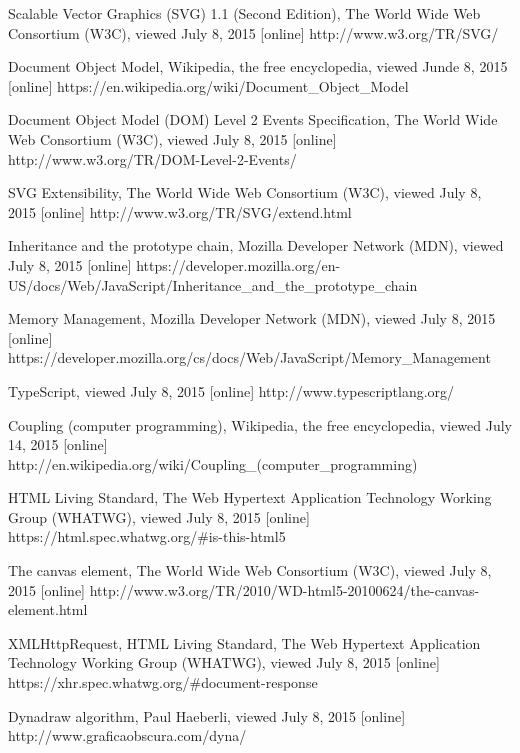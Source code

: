 \begin{thebibliography}{99}
Scalable Vector Graphics (SVG) 1.1 (Second Edition), The World Wide Web Consortium (W3C), viewed July 8, 2015 [online]
http://www.w3.org/TR/SVG/

Document Object Model, Wikipedia, the free encyclopedia, viewed Junde 8, 2015 [online]
https://en.wikipedia.org/wiki/Document\_Object\_Model

Document Object Model (DOM) Level 2 Events Specification, The World Wide Web Consortium (W3C), viewed July 8, 2015 [online]
http://www.w3.org/TR/DOM-Level-2-Events/


SVG Extensibility, The World Wide Web Consortium (W3C), viewed July 8, 2015 [online]
http://www.w3.org/TR/SVG/extend.html



Inheritance and the prototype chain, Mozilla Developer Network (MDN), viewed July 8, 2015 [online]
https://developer.mozilla.org/en-US/docs/Web/JavaScript/Inheritance\_and\_the\_prototype\_chain

Memory Management, Mozilla Developer Network (MDN), viewed July 8, 2015 [online]
https://developer.mozilla.org/cs/docs/Web/JavaScript/Memory\_Management

TypeScript, viewed July 8, 2015 [online] 
http://www.typescriptlang.org/


Coupling (computer programming), Wikipedia, the free encyclopedia, viewed July 14, 2015 [online]
http://en.wikipedia.org/wiki/Coupling\_(computer\_programming)

HTML Living Standard, The Web Hypertext Application Technology Working Group (WHATWG), viewed July 8, 2015 [online]
https://html.spec.whatwg.org/\#is-this-html5

The canvas element, The World Wide Web Consortium (W3C), viewed July 8, 2015 [online]
http://www.w3.org/TR/2010/WD-html5-20100624/the-canvas-element.html

XMLHttpRequest, HTML Living Standard, The Web Hypertext Application Technology Working Group (WHATWG), viewed July 8, 2015 [online]
https://xhr.spec.whatwg.org/\#document-response


Dynadraw algorithm, Paul Haeberli, viewed July 8, 2015 [online]
http://www.graficaobscura.com/dyna/



\end{thebibliography}
